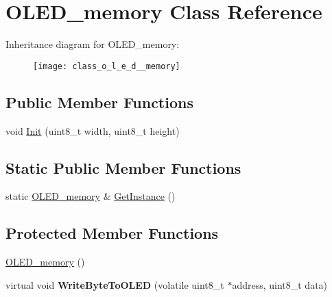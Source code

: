 \hypertarget{class_o_l_e_d__memory}{}\section{O\+L\+E\+D\+\_\+memory Class Reference}
\label{class_o_l_e_d__memory}
Inheritance diagram for O\+L\+E\+D\+\_\+memory\+:\begin{figure}[H]
\begin{center}
\leavevmode
\texttt{[image: class\_o\_l\_e\_d\_\_memory]}
\end{center}
\end{figure}
\subsection*{Public Member Functions}
\begin{DoxyCompactItemize}
\item 
void \hyperlink{class_o_l_e_d__memory_a5ad8acab1fda3221d490d49bd6aad418}{Init} (uint8\+\_\+t width, uint8\+\_\+t height)
\end{DoxyCompactItemize}
\subsection*{Static Public Member Functions}
\begin{DoxyCompactItemize}
\item 
static \hyperlink{class_o_l_e_d__memory}{O\+L\+E\+D\+\_\+memory} \& \hyperlink{class_o_l_e_d__memory_a8d20efdd852c066b46950bc7b98ff368}{Get\+Instance} ()
\end{DoxyCompactItemize}
\subsection*{Protected Member Functions}
\begin{DoxyCompactItemize}
\item 
\hyperlink{class_o_l_e_d__memory_a237da57c485eed1ba23a9752035f3973}{O\+L\+E\+D\+\_\+memory} ()
\item 
virtual void {\bfseries Write\+Byte\+To\+O\+L\+ED} (volatile uint8\+\_\+t $\ast$address, uint8\+\_\+t data)\hypertarget{class_o_l_e_d__memory_a8859cddd8c5639d43ae89bb750984291}{}\label{class_o_l_e_d__memory_a8859cddd8c5639d43ae89bb750984291}

\end{DoxyCompactItemize}
